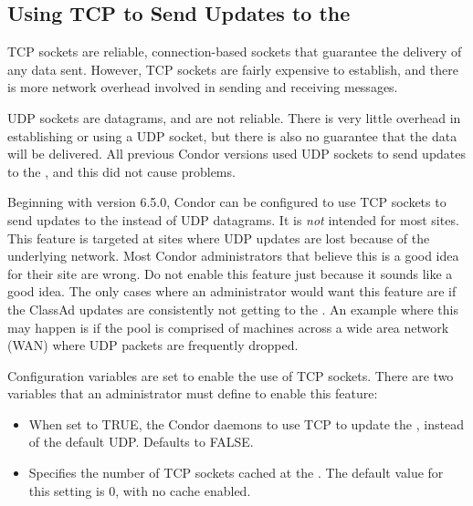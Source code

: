 \subsection{\label{sec:tcp-collector-update}
Using TCP to Send Updates to the }


TCP sockets are reliable, connection-based sockets that guarantee
the delivery of any data sent.
However, TCP sockets are fairly expensive to establish, and there is more
network overhead involved in sending and receiving messages.

UDP sockets are datagrams, and are not reliable.
There is very little overhead in establishing or using a UDP socket,
but there is also no guarantee that the data will be delivered.
All previous Condor versions used UDP sockets to send updates to
the , and this did not cause problems.

Beginning with version 6.5.0, Condor can be configured to use TCP
sockets to send updates to the  instead of
UDP datagrams.
It is \emph{not} intended for most sites.
This feature is targeted at sites where UDP updates are
lost because of the underlying network.
Most Condor administrators that believe this is a good idea for
their site are wrong.
Do not enable this feature just because it sounds like a good idea.
The only cases where an administrator would want this feature are if
the ClassAd updates are consistently not getting to the
.
An example where this may happen is if the pool is comprised of
machines across a wide area network (WAN) where UDP packets are
frequently dropped.

Configuration variables are set to enable the use of TCP sockets.
There are two variables that an
administrator must define to enable this feature:

\begin{itemize}

\item[\Macro{UPDATE\_COLLECTOR\_WITH\_TCP}]
  When set to TRUE, the Condor daemons to use TCP to
  update the , instead of the default UDP.
  Defaults to FALSE.

\item[\Macro{COLLECTOR\_SOCKET\_CACHE\_SIZE}] 
  Specifies the number of TCP sockets cached at the .
  The default value for this setting is 0, with no cache enabled.

\end{itemize}

